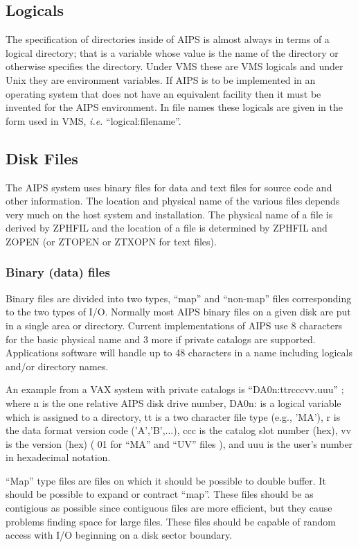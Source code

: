 \subsection{Logicals}
The specification of directories inside of AIPS is almost always in
terms of a logical directory; that is a variable whose value is the
name of the directory or otherwise specifies the directory.  Under VMS
these are VMS logicals and under Unix they are environment variables.
If AIPS is to be implemented in an operating system that does not have
an equivalent facility then it must be invented for the AIPS
environment.  In file names these logicals are given in the form used
in VMS, {\it i.e.} ``logical:filename''.

\subsection{Disk Files }
The AIPS system uses binary files for data and text files for source
code and other information.  The location and physical name of the
various files depends very much on the host system and installation.
The physical name of a file is derived by ZPHFIL and the location of a
file is determined by ZPHFIL and ZOPEN (or ZTOPEN or ZTXOPN for text
files).

\subsubsection{Binary (data) files }
Binary files are divided into two types, ``map'' and ``non-map'' files
corresponding to the two types of I/O.  Normally most AIPS binary
files on a given disk are put in a single area or directory.  Current
implementations of AIPS use 8 characters for the basic physical name
and 3 more if private catalogs are supported. Applications software
will handle up to 48 characters in a name including logicals and/or
directory names.

An example from a VAX system with private catalogs is
``DA0n:ttrcccvv.uuu'' ; where n is the one relative AIPS disk drive number,
DA0n: is a logical variable which is assigned to a directory, tt is a
two character file type (e.g., 'MA'), r is the data format version
code ('A','B',...), ccc is the catalog slot number (hex), vv is the
version (hex) ( 01 for ``MA'' and ``UV'' files ), and uuu is the user's
number in hexadecimal notation.

``Map'' type files are files on which it should be possible to double
buffer.  It should be possible to expand or contract ``map''.
These files should be as contigious as possible since contiguous files
are more efficient, but they cause problems finding space for large
files.  These files should be capable of random access with I/O
beginning on a disk sector boundary.

